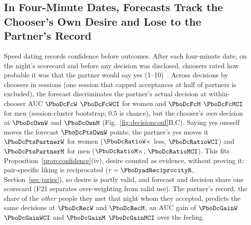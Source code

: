 \subsection{In Four-Minute Dates, Forecasts Track the Chooser's Own Desire and Lose to the Partner's Record}
Speed dating records confidence before outcomes. After each four-minute date, on the night's scorecard and before any decision was disclosed, choosers rated how probable it was that the partner would say yes (1--10)~\cite{fisman2006}. Across \PboDcN{} decisions by \PboDcChoosers{} choosers in \PboDcSessions{} sessions (one session that capped acceptances at half of partners is excluded), the forecast discriminates the partner's actual decision at within-chooser AUC $\PboDcFcW$ $\PboDcFcWCI$ for women and $\PboDcFcM$ $\PboDcFcMCI$ for men (session-cluster bootstrap; $0.5$ is chance), but the chooser's \emph{own} decision at $\PboDcOwnW$ and $\PboDcOwnM$ (Fig.~\ref{fig:decisionconf}B,C). Saying yes oneself moves the forecast $\PboDcPtsOwnW$ points; the partner's yes moves it $\PboDcPtsPartnerW$ for women ($\PboDcRatioW\times$ less, $\PboDcRatioWCI$) and $\PboDcPtsPartnerM$ for men ($\PboDcRatioM\times$, $\PboDcRatioMCI$). This fits Proposition~\ref{prop:confidence}(iv), desire counted as evidence, without proving it: pair-specific liking is reciprocated ($r=\PboDyadReciprocityR$, Section~\ref{sec:juries}), so desire is partly valid, and forecast and decision share one scorecard (F21 separates over-weighting from valid use). The partner's record, the share of the \emph{other} people they met that night whom they accepted, predicts the same decisions at $\PboDcRecW$ and $\PboDcRecM$, an AUC gain of $\PboDcGainW$ $\PboDcGainWCI$ and $\PboDcGainM$ $\PboDcGainMCI$ over the feeling.


